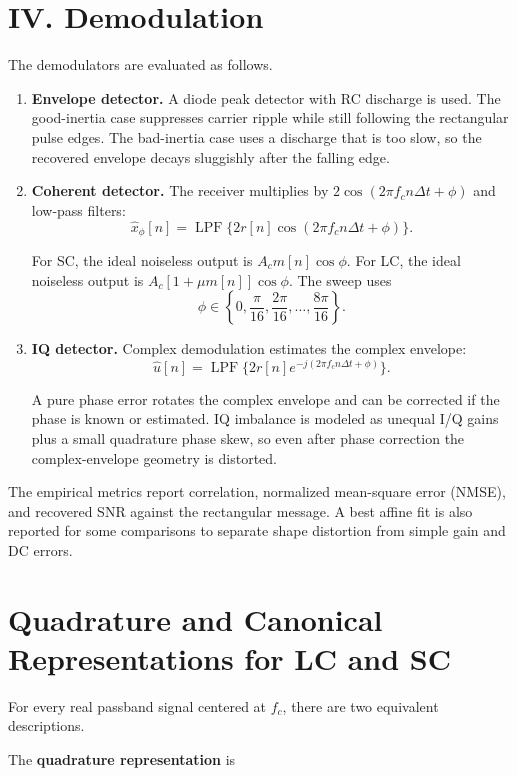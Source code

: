 \documentclass[11pt]{article}
\begin{document}
\section{IV. Demodulation}

The demodulators are evaluated as follows.

\begin{enumerate}
\item \textbf{Envelope detector.} A diode peak detector with RC discharge is used. The good-inertia case suppresses carrier ripple while still following the rectangular pulse edges. The bad-inertia case uses a discharge that is too slow, so the recovered envelope decays sluggishly after the falling edge.
\item \textbf{Coherent detector.} The receiver multiplies by $2\cos(2\pi f_c n\Delta t+\phi)$ and low-pass filters:
\[
\widehat{x}_{\phi}[n]=\operatorname{LPF}\{2r[n]\cos(2\pi f_c n\Delta t+\phi)\}.
\]

For SC, the ideal noiseless output is $A_c m[n]\cos\phi$. For LC, the ideal noiseless output is $A_c[1+\mu m[n]]\cos\phi$. The sweep uses
\[
\phi\in\left\{0,\frac{\pi}{16},\frac{2\pi}{16},\ldots,\frac{8\pi}{16}\right\}.
\]

\item \textbf{IQ detector.} Complex demodulation estimates the complex envelope:
\[
\widehat{u}[n]=\operatorname{LPF}\{2r[n]e^{-j(2\pi f_c n\Delta t+\phi)}\}.
\]

A pure phase error rotates the complex envelope and can be corrected if the phase is known or estimated. IQ imbalance is modeled as unequal I/Q gains plus a small quadrature phase skew, so even after phase correction the complex-envelope geometry is distorted.
\end{enumerate}

The empirical metrics report correlation, normalized mean-square error (NMSE), and recovered SNR against the rectangular message. A best affine fit is also reported for some comparisons to separate shape distortion from simple gain and DC errors.

\section{Quadrature and Canonical Representations for LC and SC}

For every real passband signal centered at $f_c$, there are two equivalent descriptions.

The \textbf{quadrature representation} is
\end{document}
